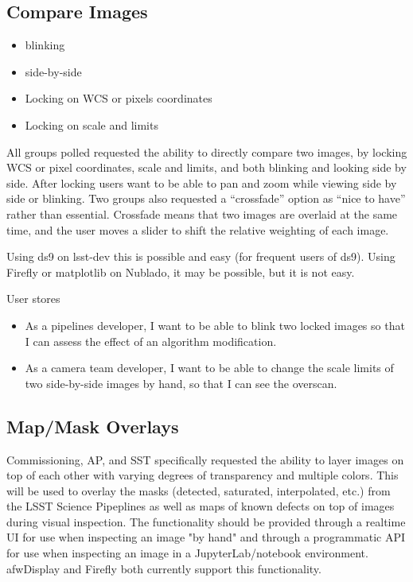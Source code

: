\subsection{Compare Images}
\begin{itemize}
\item{blinking}
\item{side-by-side}
\item{Locking on WCS or pixels coordinates}
\item{Locking on scale and limits}
\end{itemize}

All groups polled requested the ability to directly compare two images, by locking WCS or pixel coordinates, scale and limits, and both blinking and looking side by side.
After locking users want to be able to pan and zoom while viewing side by side or blinking.
Two groups also requested a ``crossfade'' option as ``nice to have'' rather than essential.
Crossfade means that two images are overlaid at the same time, and the user moves a slider to shift the relative weighting of each image.

Using ds9 on lsst-dev this is possible and easy (for frequent users of ds9).
Using Firefly or matplotlib on Nublado, it may be possible, but it is not easy.

User stores
\begin{itemize}
\item{As a pipelines developer,  I want to be able to blink two locked images so that I can assess the effect of an algorithm modification.}
\item{As a camera team developer,  I want to be able to change the scale limits of two side-by-side images by hand, so that I can see the overscan.}
\end{itemize}

\subsection{Map/Mask Overlays}

Commissioning, AP, and SST specifically requested the ability to layer images on
top of each other with varying degrees of transparency and multiple colors.
This will be used to overlay the masks (detected, saturated, interpolated, etc.)
from the LSST Science Pipeplines as well as maps of known defects on top of
images during visual inspection.  The functionality should be provided through
a realtime UI for use when inspecting an image "by hand" and through a
programmatic API for use when inspecting an image in a JupyterLab/notebook
environment. afwDisplay and Firefly both currently support this
functionality.
